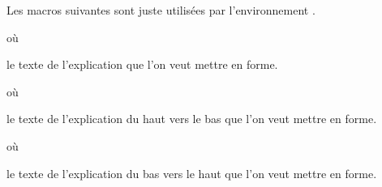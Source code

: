 \documentclass[12pt,a4paper]{article}
\begin{document}
Les macros suivantes sont juste utilisées par l'environnement .


\separation




\separation


 où \quad {}

\IDarg{} le texte de l'explication que l'on veut mettre en forme.


\separation


 où \quad {}

\IDarg{} le texte de l'explication du haut vers le bas que l'on veut mettre en forme.


\separation


 où \quad {}

\IDarg{} le texte de l'explication du bas vers le haut que l'on veut mettre en forme.
\end{document}
